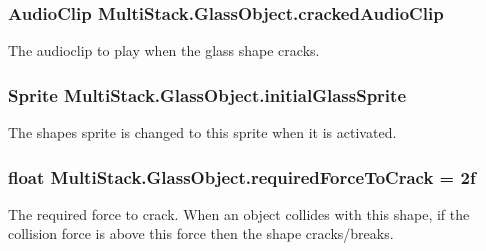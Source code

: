 \hypertarget{class_multi_stack_1_1_glass_object_a371c5cf69b11f23d2da81a3e819d6bf8}{}
\subsubsection[{cracked\+Audio\+Clip}]{\setlength{\rightskip}{0pt plus 5cm}Audio\+Clip Multi\+Stack.\+Glass\+Object.\+cracked\+Audio\+Clip}\label{class_multi_stack_1_1_glass_object_a371c5cf69b11f23d2da81a3e819d6bf8}


The audioclip to play when the glass shape cracks. 

\hypertarget{class_multi_stack_1_1_glass_object_a9ef4bb35966c6cb6861b70ee178e5074}{}
\subsubsection[{initial\+Glass\+Sprite}]{\setlength{\rightskip}{0pt plus 5cm}Sprite Multi\+Stack.\+Glass\+Object.\+initial\+Glass\+Sprite}\label{class_multi_stack_1_1_glass_object_a9ef4bb35966c6cb6861b70ee178e5074}


The shapes sprite is changed to this sprite when it is activated. 

\hypertarget{class_multi_stack_1_1_glass_object_ae9c87a466956cd98113e0b17ad11bcd5}{}
\subsubsection[{required\+Force\+To\+Crack}]{\setlength{\rightskip}{0pt plus 5cm}float Multi\+Stack.\+Glass\+Object.\+required\+Force\+To\+Crack = 2f}\label{class_multi_stack_1_1_glass_object_ae9c87a466956cd98113e0b17ad11bcd5}


The required force to crack. When an object collides with this shape, if the collision force is above this force then the shape cracks/breaks. 


